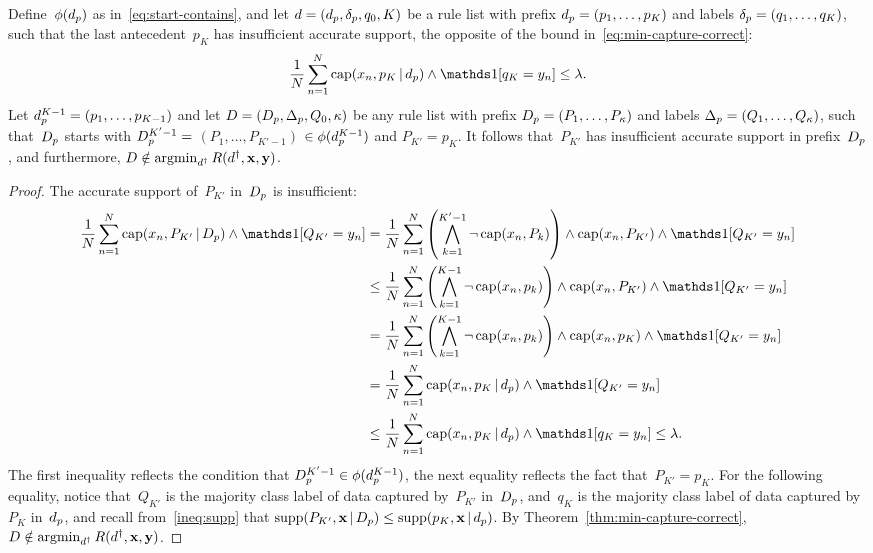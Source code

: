 \begin{arxiv}
\begin{proposition}
\label{prop:min-capture-correct}
Define~$\phi(d_p)$ as in~\eqref{eq:start-contains},
and let ${{d} = (d_p, \delta_p, q_0, K)}$ be a rule list
with prefix ${d_p = (p_1, \dots, p_{K})}$
and labels ${\delta_p = (q_1, \dots, q_{K})}$, such that
the last antecedent~$p_{K}$ has insufficient accurate support,
\ie the opposite of the bound in~\eqref{eq:min-capture-correct}:
\begin{align}
\frac{1}{N} \sum_{n=1}^N \Cap(x_n, p_K \given \Prefix) \wedge \one [ q_K = y_n ]
\le \Reg.
\end{align}
%
Let ${d_p^{K-1} = (p_1, \dots, p_{K-1})}$
and let ${{D} = (D_p, \Delta_p, Q_0, \kappa)}$
be any rule list with prefix ${D_p = (P_1, \dots, P_{\kappa})}$
and labels ${\Delta_p = (Q_1, \dots, Q_{\kappa})}$,
such that~$D_p$ starts with ${D_p^{K'-1} =}$
${(P_1, \dots, P_{K'-1})}$ ${\in \phi(d_p^{K-1})}$
and ${P_{K'} = p_{K}}$.
%
It follows that~$P_{K'}$ has insufficient accurate support in
prefix~$D_p$, and furthermore,
${{D} \notin \operatorname*{argmin}_{{d}^\dagger} R({d}^\dagger, \mathbf{x}, \mathbf{y})}$.
\end{proposition}

\begin{proof}
The accurate support of~$P_{K'}$ in~$D_p$ is insufficient:
\begin{align}
\frac{1}{N} \sum_{n=1}^N \Cap(x_n, P_{K'} \given \PrefixB) \wedge \one [ Q_{K'} = y_n ]
&= \frac{1}{N} \sum_{n=1}^N \left( \bigwedge_{k=1}^{K'-1} \neg\, \Cap(x_n, P_k) \right)
   \wedge \Cap(x_n, P_{K'}) \wedge \one [ Q_{K'} = y_n ] \nn \\
&\le \frac{1}{N} \sum_{n=1}^N \left( \bigwedge_{k=1}^{K-1} \neg\, \Cap(x_n, p_k) \right)
   \wedge \Cap(x_n, P_{K'}) \wedge \one [ Q_{K'} = y_n ] \nn \\
&= \frac{1}{N} \sum_{n=1}^N \left( \bigwedge_{k=1}^{K-1} \neg\, \Cap(x_n, p_k) \right)
   \wedge \Cap(x_n, p_K) \wedge \one [ Q_{K'} = y_n ] \nn \\
&= \frac{1}{N} \sum_{n=1}^N \Cap(x_n, p_K \given \Prefix) \wedge \one [ Q_{K'} = y_n ] \nn \\
&\le \frac{1}{N} \sum_{n=1}^N \Cap(x_n, p_K \given \Prefix) \wedge \one [ q_{K} = y_n ]
\le \Reg.
\end{align}
The first inequality reflects the condition that
${D_p^{K'-1} \in \phi(d_p^{K-1})}$,
the next equality reflects the fact that~${P_{K'} = p_K}$.
%
For the following equality, notice that~$Q_{K'}$ is the majority
class label of data captured by~$P_{K'}$ in~$D_p$, and~$q_K$
is the majority class label of data captured by~$P_K$ in~$d_p$,
and recall from~\eqref{ineq:supp} that
${\textnormal{supp}(P_{K'}, \mathbf{x} \,|\, D_p) \le \textnormal{supp}(p_{K}, \mathbf{x} \,|\, d_p)}$.
%
By Theorem~\ref{thm:min-capture-correct},
${{D} \notin \operatorname*{argmin}_{{d}^\dagger} R({d}^\dagger, \mathbf{x}, \mathbf{y})}$.
\end{proof}


\end{arxiv}
